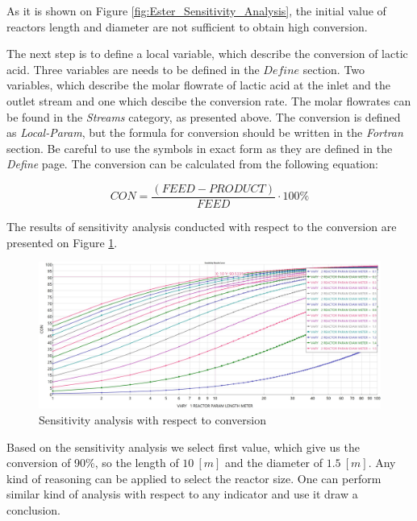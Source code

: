 As it is shown on Figure \ref{fig:Ester_Sensitivity_Analysis}, the initial value of reactors length and diameter are not sufficient to obtain high conversion.

The next step is to define a local variable, which describe the conversion of lactic acid. Three variables are needs to be defined in the $Define$ section. Two variables, which describe the molar flowrate of lactic acid at the inlet and the outlet stream and one which descibe the conversion rate. The molar flowrates can be found in the \textit{Streams} category, as presented above. The conversion is defined as \textit{Local-Param}, but the formula for conversion should be written in the \textit{Fortran} section. Be
careful to use the symbols in exact form as they are defined in the \textit{Define} page. The conversion can be calculated from the following equation:

\begin{equation}
	CON = \frac{\left( FEED - PRODUCT \right)}{FEED} \cdot 100 \%
\end{equation}

The results of sensitivity analysis conducted with respect to the conversion are presented on Figure \ref{fig:Ester_Sensitivity_Analysis_Conversion}.

\begin{figure}[h!]
	\centering
	\includegraphics[width=\textwidth]{Figures/Proces_Analysis/Parametric_sensitivity_analysis_conversion.jpg}
	\caption{Sensitivity analysis with respect to conversion}
	\label{fig:Ester_Sensitivity_Analysis_Conversion}
\end{figure}

Based on the sensitivity analysis we select first value, which give us the conversion of 90\%, so the length of $10~[m]$ and the diameter of $1.5~[m]$. Any kind of reasoning can be applied to select the reactor size. One can perform similar kind of analysis with respect to any indicator and use it draw a conclusion.

